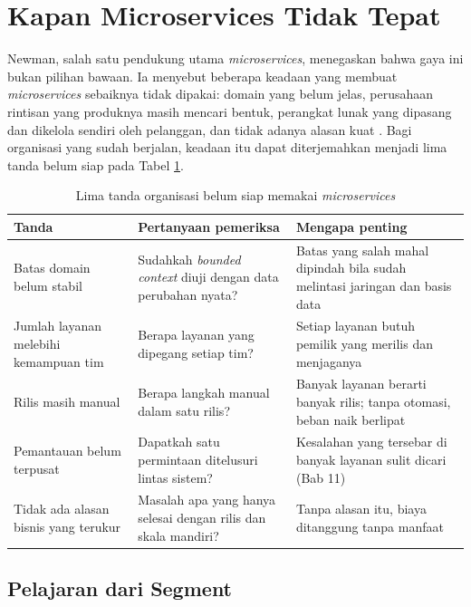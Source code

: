 \section{Kapan Microservices Tidak Tepat}
\label{sec:ch07-tidak-tepat}

Newman, salah satu pendukung utama \textit{microservices}, menegaskan bahwa gaya ini bukan pilihan
bawaan. Ia menyebut beberapa keadaan yang membuat \textit{microservices} sebaiknya tidak dipakai:
domain yang belum jelas, perusahaan rintisan yang produknya masih mencari bentuk, perangkat lunak yang
dipasang dan dikelola sendiri oleh pelanggan, dan tidak adanya alasan kuat \cite{newman2021}. Bagi
organisasi yang sudah berjalan, keadaan itu dapat diterjemahkan menjadi lima tanda belum siap pada
Tabel \ref{tab:ch07-tanda-belum-siap}.

\begin{table}[!htb]
  \centering
  \caption{Lima tanda organisasi belum siap memakai \textit{microservices}}
  \label{tab:ch07-tanda-belum-siap}
  \footnotesize
  \begin{tabularx}{\textwidth}{>{\raggedright\arraybackslash}p{2.9cm} >{\raggedright\arraybackslash}X >{\raggedright\arraybackslash}X}
    \hline
    \textbf{Tanda} & \textbf{Pertanyaan pemeriksa} & \textbf{Mengapa penting} \\ \hline
    Batas domain belum stabil & Sudahkah \textit{bounded context} diuji dengan data perubahan
      nyata? & Batas yang salah mahal dipindah bila sudah melintasi jaringan dan basis data \\
      \hline
    Jumlah layanan melebihi kemampuan tim & Berapa layanan yang dipegang setiap tim? & Setiap
      layanan butuh pemilik yang merilis dan menjaganya \\ \hline
    Rilis masih manual & Berapa langkah manual dalam satu rilis? & Banyak layanan berarti banyak
      rilis; tanpa otomasi, beban naik berlipat \\ \hline
    Pemantauan belum terpusat & Dapatkah satu permintaan ditelusuri lintas sistem? & Kesalahan
      yang tersebar di banyak layanan sulit dicari (Bab 11) \\ \hline
    Tidak ada alasan bisnis yang terukur & Masalah apa yang hanya selesai dengan rilis dan skala
      mandiri? & Tanpa alasan itu, biaya ditanggung tanpa manfaat \\ \hline
  \end{tabularx}
\end{table}

\subsection{Pelajaran dari Segment}


